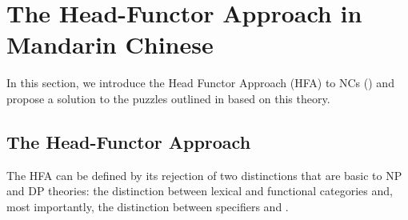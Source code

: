 \documentclass[output=paper,colorlinks,citecolor=brown]{langscibook}
\begin{document}
\section{The Head-Functor Approach in Mandarin Chinese}\label{sec:h-f:deng}


In this section, we introduce the Head Functor Approach (HFA) to NCs (\citealt{Allegranza98a,Allegranza07a,VanEynde06a,VanEynde20a,VanEynde21a}) and  propose a solution to the puzzles outlined in  based on this theory.  


\subsection{The Head-Functor Approach}



The HFA can be defined by its rejection of two distinctions that are basic to NP and DP theories: the distinction between lexical and functional categories and, most importantly, the distinction between specifiers and .%


\end{document}
